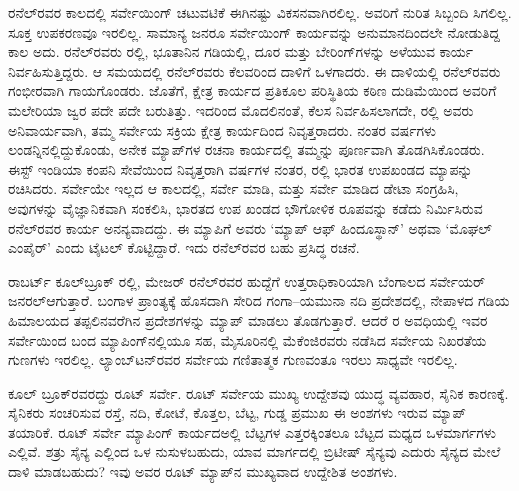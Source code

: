 ರನೆಲ್​ರವರ ಕಾಲದಲ್ಲಿ ಸರ್ವೇಯಿಂಗ್​ ಚಟುವಟಿಕೆ ಈಗಿನಷ್ಟು ವಿಕಸನವಾಗಿರಲಿಲ್ಲ. ಅವರಿಗೆ ನುರಿತ ಸಿಬ್ಬಂದಿ ಸಿಗಲಿಲ್ಲ. ಸೂಕ್ತ ಉಪಕರಣವೂ ಇರಲಿಲ್ಲ. ಸಾಮಾನ್ಯ ಜನರೂ ಸರ್ವೇಯಿಂಗ್​ ಕಾರ್ಯವನ್ನು ಅನುಮಾನದಿಂದಲೇ ನೋಡುತಿದ್ದ ಕಾಲ ಅದು. ರನೆಲ್​ರವರು  ರಲ್ಲಿ, ಭೂತಾನಿನ ಗಡಿಯಲ್ಲಿ, ದೂರ ಮತ್ತು ಬೇರಿಂಗ್​ಗಳನ್ನು ಅಳೆಯುವ ಕಾರ್ಯ ನಿರ್ವಹಿಸುತ್ತಿದ್ದರು. ಆ ಸಮಯದಲ್ಲಿ ರನೆಲ್​ರವರು ಕೆಲವರಿಂದ ದಾಳಿಗೆ ಒಳಗಾದರು. ಈ ದಾಳಿಯಲ್ಲಿ ರನೆಲ್​ರವರು ಗಂಭೀರವಾಗಿ ಗಾಯಗೊಂಡರು. ಜೊತೆಗೆ, ಕ್ಷೇತ್ರ ಕಾರ್ಯದ ಪ್ರತಿಕೂಲ ಪರಿಸ್ಥಿತಿಯ ಕಠಿಣ ದುಡಿಮೆಯಿಂದ ಅವರಿಗೆ ಮಲೇರಿಯಾ ಜ್ವರ ಪದೇ ಪದೇ ಬರುತಿತ್ತು. ಇದರಿಂದ ಮೊದಲಿನಂತೆ, ಕೆಲಸ ನಿರ್ವಹಿಸಲಾಗದೇ, ರಲ್ಲಿ ಅವರು ಅನಿವಾರ್ಯವಾಗಿ, ತಮ್ಮ ಸರ್ವೇಯ ಸಕ್ರಿಯ ಕ್ಷೇತ್ರ ಕಾರ್ಯದಿಂದ ನಿವೃತ್ತರಾದರು. ನಂತರ  ವರ್ಷಗಳು ಲಂಡನ್ನಿನಲ್ಲಿದ್ದುಕೊಂಡು, ಅನೇಕ ಮ್ಯಾಪ್​ಗಳ ರಚನಾ ಕಾರ್ಯದಲ್ಲಿ ತಮ್ಮನ್ನು ಪೂರ್ಣವಾಗಿ ತೊಡಗಿಸಿಕೊಂಡರು. ಈಸ್ಟ್​ ಇಂಡಿಯಾ ಕಂಪನಿ ಸೇವೆಯಿಂದ ನಿವೃತ್ತರಾಗಿ  ವರ್ಷಗಳ ನಂತರ,  ರಲ್ಲಿ ಭಾರತ ಉಪಖಂಡದ ಮ್ಯಾಪನ್ನು ರಚಿಸಿದರು. ಸರ್ವೇಯೇ ಇಲ್ಲದ ಆ ಕಾಲದಲ್ಲಿ, ಸರ್ವೇ ಮಾಡಿ, ಮತ್ತು ಸರ್ವೇ ಮಾಡಿದ ಡೇಟಾ ಸಂಗ್ರಹಿಸಿ, ಅವುಗಳನ್ನು ವೈಜ್ಞಾನಿಕವಾಗಿ ಸಂಕಲಿಸಿ, ಭಾರತದ ಉಪ ಖಂಡದ ಭೌಗೋಳಿಕ ರೂಪವನ್ನು ಕಡೆದು ನಿರ್ಮಿಸಿರುವ ರನೆಲ್​ರವರ ಕಾರ್ಯ ಅನನ್ಯವಾದದ್ದು. ಈ ಮ್ಯಾಪಿಗೆ ಅವರು ‘ಮ್ಯಾಪ್​ ಆಫ್​ ಹಿಂದೂಸ್ಥಾನ್​’ ಅಥವಾ ‘ಮೊಘಲ್​ ಎಂಪೈರ್​’ ಎಂದು ಟೈಟಲ್​ ಕೊಟ್ಟಿದ್ದಾರೆ. ಇದು ರನೆಲ್​ರವರ ಬಹು ಪ್ರಸಿದ್ಧ ರಚನೆ.

ರಾಬರ್ಟ್ ಕೂಲ್​ಬ್ರೂಕ್​ ರಲ್ಲಿ, ಮೇಜರ್​ ರನೆಲ್​ರವರ ಹುದ್ದೆಗೆ ಉತ್ತರಾಧಿಕಾರಿಯಾಗಿ ಬೆಂಗಾಲದ ಸರ್ವೇಯರ್​ ಜನರಲ್​ ಆಗುತ್ತಾರೆ. ಬಂಗಾಳ ಪ್ರಾಂತ್ಯಕ್ಕೆ ಹೊಸದಾಗಿ ಸೇರಿದ ಗಂಗಾ–ಯಮುನಾ ನದಿ ಪ್ರದೇಶದಲ್ಲಿ, ನೇಪಾಳದ ಗಡಿಯ ಹಿಮಾಲಯದ ತಪ್ಪಲಿನವರೆಗಿನ ಪ್ರದೇಶಗಳನ್ನು ಮ್ಯಾಪ್​ ಮಾಡಲು ತೊಡಗುತ್ತಾರೆ. ಆದರೆ ರ ಅವಧಿಯಲ್ಲಿ ಇವರ ಸರ್ವೇಯಿಂದ ಬಂದ ಮ್ಯಾಪಿಂಗ್​ನಲ್ಲಿಯೂ ಸಹ, ಮೈಸೂರಿನಲ್ಲಿ ಮೆಕೆಂಜಿರವರು ನಡೆಸಿದ ಸರ್ವೇಯ ನಿಖರತೆಯ ಗುಣಗಳು ಇರಲಿಲ್ಲ. ಲ್ಯಾಂಬ್​ಟನ್​ರವರ ಸರ್ವೇಯ ಗಣಿತಾತ್ಮಕ ಗುಣವಂತೂ ಇರಲು ಸಾಧ್ಯವೇ ಇರಲಿಲ್ಲ.

ಕೂಲ್​ ಬ್ರೂಕ್​ರವರದ್ದು ರೂಟ್​ ಸರ್ವೇ. ರೂಟ್​ ಸರ್ವೇಯ ಮುಖ್ಯ ಉದ್ದೇಶವು ಯುದ್ಧ ವ್ಯವಹಾರ, ಸೈನಿಕ ಕಾರಣಕ್ಕೆ. ಸೈನಿಕರು ಸಂಚರಿಸುವ ರಸ್ತೆ, ನದಿ, ಕೋಟೆ, ಕೊತ್ತಲ, ಬೆಟ್ಟ, ಗುಡ್ಡ ಪ್ರಮುಖ ಈ ಅಂಶಗಳು ಇರುವ ಮ್ಯಾಪ್​ ತಯಾರಿಕೆ. ರೂಟ್​ ಸರ್ವೇ ಮ್ಯಾಪಿಂಗ್​ ಕಾರ್ಯದಅಲ್ಲಿ ಬೆಟ್ಟಗಳ ಎತ್ತರಕ್ಕಿಂತಲೂ ಬೆಟ್ಟದ ಮಧ್ಯದ ಒಳಮಾರ್ಗಗಳು ಎಲ್ಲಿವೆ. ಶತ್ರು ಸೈನ್ಯ ಎಲ್ಲಿಂದ ಒಳ ನುಸುಳಬಹುದು, ಯಾವ ಮಾರ್ಗದಲ್ಲಿ ಬ್ರಿಟೀಷ್​ ಸೈನ್ಯವು ಎದುರು ಸೈನ್ಯದ ಮೇಲೆ ದಾಳಿ ಮಾಡಬಹುದು? ಇವು ಅವರ ರೂಟ್​ ಮ್ಯಾಪ್​ನ ಮುಖ್ಯವಾದ ಉದ್ದೇಶಿತ ಅಂಶಗಳು.

